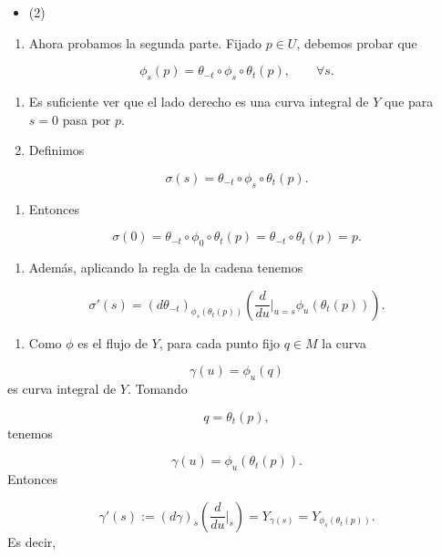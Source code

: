 \begin{bookproof}{}
\begin{itemize}
\item (2)
\end{itemize}
\begin{enumerate}
\item Ahora probamos la segunda parte. Fijado $p\in U$, debemos probar que
\end{enumerate}
\[
\phi_s(p)=\theta_{-t}\circ\phi_s\circ\theta_t(p),\qquad \forall s.
\]
\begin{enumerate}[start=2]
\item Es suficiente ver que el lado derecho es una curva integral de $Y$ que para $s=0$ pasa por $p$.
\item Definimos
\end{enumerate}
\[
\sigma(s)=\theta_{-t}\circ\phi_s\circ\theta_t(p).
\]
\begin{enumerate}[start=4]
\item Entonces
\end{enumerate}
\[
\sigma(0)=\theta_{-t}\circ\phi_0\circ\theta_t(p)=\theta_{-t}\circ\theta_t(p)=p.
\]
\begin{enumerate}[start=5]
\item Además, aplicando la regla de la cadena tenemos
\end{enumerate}
\[
\sigma'(s)=(d\theta_{-t})_{\phi_s(\theta_t(p))}\left(\frac{d}{du}\bigg|_{u=s}\phi_u(\theta_t(p))\right).
\]
\begin{enumerate}[start=6]
\item Como $\phi$ es el flujo de $Y$, para cada punto fijo $q\in M$ la curva
\end{enumerate}
\[
\gamma(u)=\phi_u(q)
\]
es curva integral de $Y$. Tomando

\[
q=\theta_t(p),
\]
tenemos

\[
\gamma(u)=\phi_u(\theta_t(p)).
\]
Entonces

\[
\gamma'(s):= (d\gamma)_s\left(\frac{d}{du}\bigg|_s\right)=Y_{\gamma(s)}=Y_{\phi_s(\theta_t(p))}.
\]
Es decir,


\end{bookproof}
